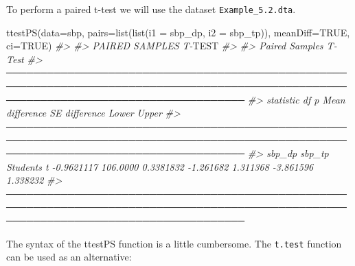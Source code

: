 \documentclass[
]{memoir}
\newenvironment{Shaded}{\begin{snugshade}}{\end{snugshade}}
\newcommand{\AlertTok}[1]{\textcolor[rgb]{0.94,0.16,0.16}{#1}}
\newcommand{\AttributeTok}[1]{\textcolor[rgb]{0.77,0.63,0.00}{#1}}
\newcommand{\CommentTok}[1]{\textcolor[rgb]{0.56,0.35,0.01}{\textit{#1}}}
\newcommand{\ConstantTok}[1]{\textcolor[rgb]{0.00,0.00,0.00}{#1}}
\newcommand{\FunctionTok}[1]{\textcolor[rgb]{0.00,0.00,0.00}{#1}}
\newcommand{\NormalTok}[1]{#1}
\newcommand{\SpecialCharTok}[1]{\textcolor[rgb]{0.00,0.00,0.00}{#1}}
\newcommand{\StringTok}[1]{\textcolor[rgb]{0.31,0.60,0.02}{#1}}
\begin{document}
To perform a paired t-test we will use the dataset \texttt{Example\_5.2.dta}.

\begin{Shaded}
\begin{Highlighting}[]
\FunctionTok{ttestPS}\NormalTok{(}\AttributeTok{data=}\NormalTok{sbp, }\AttributeTok{pairs=}\FunctionTok{list}\NormalTok{(}\FunctionTok{list}\NormalTok{(}\AttributeTok{i1 =} \StringTok{\textquotesingle{}sbp\_dp\textquotesingle{}}\NormalTok{, }\AttributeTok{i2 =} \StringTok{\textquotesingle{}sbp\_tp\textquotesingle{}}\NormalTok{)), }\AttributeTok{meanDiff=}\ConstantTok{TRUE}\NormalTok{, }\AttributeTok{ci=}\ConstantTok{TRUE}\NormalTok{)}
\CommentTok{\#\textgreater{} }
\CommentTok{\#\textgreater{}  PAIRED SAMPLES T{-}}\AlertTok{TEST}
\CommentTok{\#\textgreater{} }
\CommentTok{\#\textgreater{}  Paired Samples T{-}Test                                                                                                                   }
\CommentTok{\#\textgreater{}  ─────────────────────────────────────────────────────────────────────────────────────────────────────────────────────────────────────── }
\CommentTok{\#\textgreater{}                                       statistic     df          p            Mean difference    SE difference    Lower        Upper      }
\CommentTok{\#\textgreater{}  ─────────────────────────────────────────────────────────────────────────────────────────────────────────────────────────────────────── }
\CommentTok{\#\textgreater{}    sbp\_dp    sbp\_tp    Student\textquotesingle{}s t    {-}0.9621117    106.0000    0.3381832          {-}1.261682         1.311368    {-}3.861596    1.338232   }
\CommentTok{\#\textgreater{}  ───────────────────────────────────────────────────────────────────────────────────────────────────────────────────────────────────────}
\end{Highlighting}
\end{Shaded}

The syntax of the ttestPS function is a little cumbersome. The \texttt{t.test} function can be used as an alternative:

\begin{Shaded}
\end{Shaded}
\end{document}

